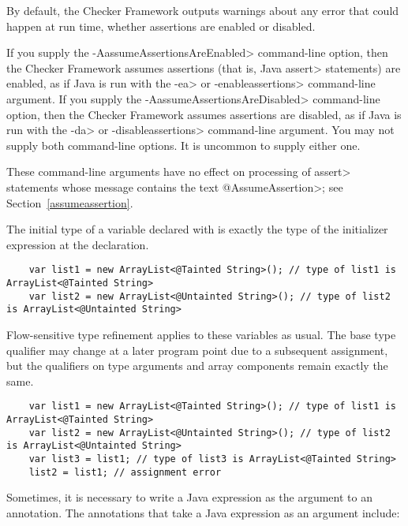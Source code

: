 By default, the Checker Framework outputs warnings about any error that
could happen at run time, whether assertions are enabled or disabled.

If you supply the \<-AassumeAssertionsAreEnabled> command-line option, then
the Checker Framework assumes assertions (that is, Java \<assert>
statements) are enabled, as if Java is run with the \<-ea> or
\<-enableassertions> command-line argument.  If you supply the
\<-AassumeAssertionsAreDisabled> command-line option, then the Checker
Framework assumes assertions are disabled, as if Java is run with the
\<-da> or \<-disableassertions> command-line argument.  You may not supply
both command-line options.  It is uncommon to supply either one.

These command-line arguments have no effect on processing of \<assert>
statements whose message contains the text \<@AssumeAssertion>; see
Section~\ref{assumeassertion}.



The initial type of a variable declared with  is exactly
the type of the initializer expression at the declaration.

\begin{Verbatim}
    var list1 = new ArrayList<@Tainted String>(); // type of list1 is ArrayList<@Tainted String>
    var list2 = new ArrayList<@Untainted String>(); // type of list2 is ArrayList<@Untainted String>
\end{Verbatim}

Flow-sensitive type refinement applies to these variables as usual.
The base type qualifier may change at a later program point due to
a subsequent assignment, but the qualifiers on type arguments and
array components remain exactly the same.

\begin{Verbatim}
    var list1 = new ArrayList<@Tainted String>(); // type of list1 is ArrayList<@Tainted String>
    var list2 = new ArrayList<@Untainted String>(); // type of list2 is ArrayList<@Untainted String>
    var list3 = list1; // type of list3 is ArrayList<@Tainted String>
    list2 = list1; // assignment error
\end{Verbatim}


Sometimes, it is necessary to write a Java expression as the argument to an
annotation.  The annotations that take a Java
expression as an argument include:

